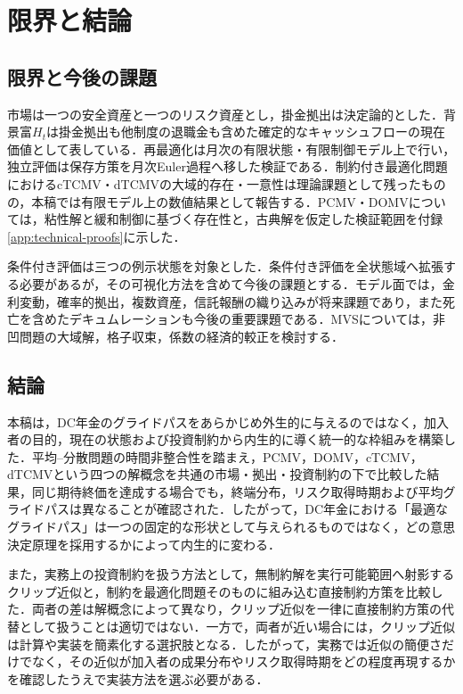 \documentclass[10pt,a4paper]{article}
\theoremstyle{plain}
\theoremstyle{definition}
\begin{document}
\section{限界と結論}\label{sec:conclusion}
\subsection{限界と今後の課題}
市場は一つの安全資産と一つのリスク資産とし，掛金拠出は決定論的とした．背景富$H_t$は掛金拠出も他制度の退職金も含めた確定的なキャッシュフローの現在価値として表している．再最適化は月次の有限状態・有限制御モデル上で行い，独立評価は保存方策を月次Euler過程へ移した検証である．制約付き最適化問題におけるcTCMV・dTCMVの大域的存在・一意性は理論課題として残ったものの，本稿では有限モデル上の数値結果として報告する．PCMV・DOMVについては，粘性解と緩和制御に基づく存在性と，古典解を仮定した検証範囲を付録\ref{app:technical-proofs}に示した．

条件付き評価は三つの例示状態を対象とした．条件付き評価を全状態域へ拡張する必要があるが，その可視化方法を含めて今後の課題とする．モデル面では，金利変動，確率的拠出，複数資産，信託報酬の織り込みが将来課題であり，また死亡を含めたデキュムレーションも今後の重要課題である．MVSについては，非凹問題の大域解，格子収束，係数の経済的較正を検討する．

\subsection{結論}
本稿は，DC年金のグライドパスをあらかじめ外生的に与えるのではなく，加入者の目的，現在の状態および投資制約から内生的に導く統一的な枠組みを構築した．平均--分散問題の時間非整合性を踏まえ，PCMV，DOMV，cTCMV，dTCMVという四つの解概念を共通の市場・拠出・投資制約の下で比較した結果，同じ期待終価を達成する場合でも，終端分布，リスク取得時期および平均グライドパスは異なることが確認された．したがって，DC年金における「最適なグライドパス」は一つの固定的な形状として与えられるものではなく，どの意思決定原理を採用するかによって内生的に変わる．

また，実務上の投資制約を扱う方法として，無制約解を実行可能範囲へ射影するクリップ近似と，制約を最適化問題そのものに組み込む直接制約方策を比較した．両者の差は解概念によって異なり，クリップ近似を一律に直接制約方策の代替として扱うことは適切ではない．一方で，両者が近い場合には，クリップ近似は計算や実装を簡素化する選択肢となる．したがって，実務では近似の簡便さだけでなく，その近似が加入者の成果分布やリスク取得時期をどの程度再現するかを確認したうえで実装方法を選ぶ必要がある．
\end{document}
